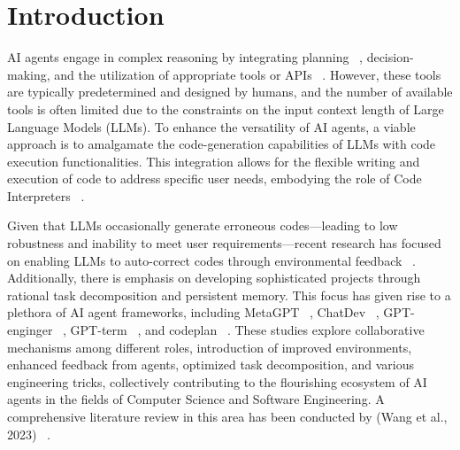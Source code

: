 \section{Introduction}

AI agents engage in complex reasoning by integrating planning ~\cite{wei2022chain, xu2023rewoo, wang2023selfconsistency, yao2023tree}, decision-making, and the utilization of appropriate tools or APIs ~\cite{schick2023toolformer, li2023apibank}. However, these tools are typically predetermined and designed by humans, and the number of available tools is often limited due to the constraints on the input context length of Large Language Models (LLMs). To enhance the versatility of AI agents, a viable approach is to amalgamate the code-generation capabilities of LLMs with code execution functionalities. This integration allows for the flexible writing and execution of code to address specific user needs, embodying the role of Code Interpreters ~\cite{openinterpreter}.

Given that LLMs occasionally generate erroneous codes—leading to low robustness and inability to meet user requirements—recent research has focused on enabling LLMs to auto-correct codes through environmental feedback ~\cite{skreta2023errors, yao2022react, wang2023voyager, song2023llmplanner}. Additionally, there is emphasis on developing sophisticated projects through rational task decomposition and persistent memory. This focus has given rise to a plethora of AI agent frameworks, including MetaGPT ~\cite{hong2023metagpt}, ChatDev ~\cite{qian2023communicative}, GPT-enginger ~\cite{GPTEngineer}, GPT-term ~\cite{GPTeam}, and codeplan ~\cite{bairi2023codeplan}. These studies explore collaborative mechanisms among different roles, introduction of improved environments, enhanced feedback from agents, optimized task decomposition, and various engineering tricks, collectively contributing to the flourishing ecosystem of AI agents in the fields of Computer Science and Software Engineering. A comprehensive literature review in this area has been conducted by (Wang et al., 2023) ~\citep{wang2023survey}.
